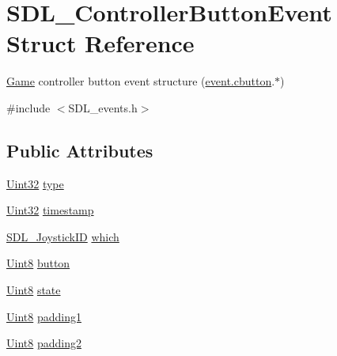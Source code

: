 \hypertarget{struct_s_d_l___controller_button_event}{\section{S\-D\-L\-\_\-\-Controller\-Button\-Event Struct Reference}
\label{struct_s_d_l___controller_button_event}
}


\hyperlink{class_game}{Game} controller button event structure (\hyperlink{union_s_d_l___event_aee2b5671c8dcdb447023715cc21593cb}{event.\-cbutton}.$\ast$)  




{\ttfamily \#include $<$S\-D\-L\-\_\-events.\-h$>$}

\subsection*{Public Attributes}
\begin{DoxyCompactItemize}
\item 
\hyperlink{_s_d_l__stdinc_8h_add440eff171ea5f55cb00c4a9ab8672d}{Uint32} \hyperlink{struct_s_d_l___controller_button_event_a09869d792031e47a88673d85915c209f}{type}
\item 
\hyperlink{_s_d_l__stdinc_8h_add440eff171ea5f55cb00c4a9ab8672d}{Uint32} \hyperlink{struct_s_d_l___controller_button_event_a73003712734c4d2f966db3d7c2ce826b}{timestamp}
\item 
\hyperlink{_s_d_l__joystick_8h_a3c3d32500cb08f76ee8077983912c0bd}{S\-D\-L\-\_\-\-Joystick\-I\-D} \hyperlink{struct_s_d_l___controller_button_event_a98777e88b5d5cae83eef16ffd4bcacc1}{which}
\item 
\hyperlink{_s_d_l__stdinc_8h_a2944638813a090aa23e62f4da842c3e2}{Uint8} \hyperlink{struct_s_d_l___controller_button_event_a039da6cd31c3c62e62a3ae17cc64d0db}{button}
\item 
\hyperlink{_s_d_l__stdinc_8h_a2944638813a090aa23e62f4da842c3e2}{Uint8} \hyperlink{struct_s_d_l___controller_button_event_a00c46683f86674c2a4f74404ee3e857c}{state}
\item 
\hyperlink{_s_d_l__stdinc_8h_a2944638813a090aa23e62f4da842c3e2}{Uint8} \hyperlink{struct_s_d_l___controller_button_event_a34d3e43fc1994288b9b083c874bc0899}{padding1}
\item 
\hyperlink{_s_d_l__stdinc_8h_a2944638813a090aa23e62f4da842c3e2}{Uint8} \hyperlink{struct_s_d_l___controller_button_event_a8caf56a3921227913cfb652d5de1eec4}{padding2}
\end{DoxyCompactItemize}


